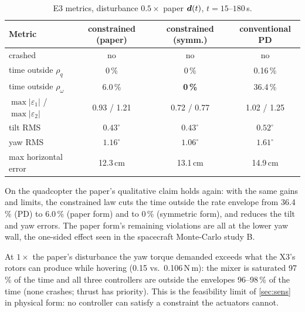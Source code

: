 
\begin{table}[H]
\centering\small
\caption{E3 metrics, disturbance $0.5\times$ paper $\bm{d}(t)$, $t=15$--$180$\,s.}
\label{tab:e3}
\begin{tabular}{@{}lccc@{}}
\toprule
\textbf{Metric} & \textbf{constrained (paper)} & \textbf{constrained (symm.)} & \textbf{conventional PD}\\
\midrule
crashed & no & no & no\\
time outside $\rho_q$ & 0\,\% & 0\,\% & 0.16\,\%\\
time outside $\rho_\omega$ & 6.0\,\% & \textbf{0\,\%} & 36.4\,\%\\
$\max|\varepsilon_1|$ / $\max|\varepsilon_2|$ & 0.93 / 1.21 & 0.72 / 0.77 & 1.02 / 1.25\\
tilt RMS & $0.43^\circ$ & $0.43^\circ$ & $0.52^\circ$\\
yaw RMS & $1.16^\circ$ & $1.06^\circ$ & $1.61^\circ$\\
max horizontal error & 12.3\,cm & 13.1\,cm & 14.9\,cm\\
\bottomrule
\end{tabular}
\end{table}

\begin{projbox}[conclusion of E3]
On the quadcopter the paper's qualitative claim holds again: with the same gains and limits, the constrained law cuts the
time outside the rate envelope from 36.4\,\% (PD) to 6.0\,\% (paper form) and to 0\,\% (symmetric form), and reduces the tilt
and yaw errors. The paper form's remaining violations are all at the lower yaw wall, the one-sided effect seen in the
spacecraft Monte-Carlo study B.
\end{projbox}

\begin{warn}
At $1\times$ the paper's disturbance the yaw torque demanded exceeds what the X3's rotors can produce while hovering
(0.15 vs.\ 0.106\,N\,m): the mixer is saturated 97\,\% of the time and all three controllers are outside the envelopes
96--98\,\% of the time (none crashes; thrust has priority). This is the feasibility limit of \cref{sec:sens} in physical form:
no controller can satisfy a constraint the actuators cannot.
\end{warn}

